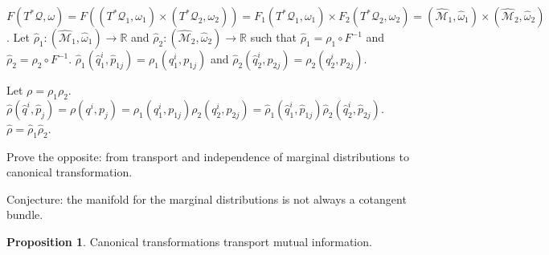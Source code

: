 \documentclass[smallextended]{svjour3}
\numberwithin{equation}{section}
\theoremstyle{definition}
\newtheorem{prop}[equation]{Proposition}
\begin{document}
$F(T^*\mathcal{Q}, \omega) = F((T^*\mathcal{Q}_1, \omega_1) \times (T^*\mathcal{Q}_2, \omega_2)) = F_1(T^*\mathcal{Q}_1, \omega_1) \times F_2(T^*\mathcal{Q}_2, \omega_2) = (\hat{\mathcal{M}}_1, \hat{\omega}_1) \times (\hat{\mathcal{M}}_2, \hat{\omega}_2)$.
Let $\hat{\rho}_1 : (\hat{\mathcal{M}}_1, \hat{\omega}_1) \rightarrow \mathbb{R}$ and $\hat{\rho}_2 : (\hat{\mathcal{M}}_2, \hat{\omega}_2) \rightarrow \mathbb{R}$ such that $\hat{\rho}_1 = \rho_1 \circ F^{-1 }$ and $\hat{\rho}_2 = \rho_2 \circ F^{-1 }$.  $\hat{\rho}_1(\hat{q}_1^i, \hat{p}_{1j})=\rho_1(q_1^i, p_{1j})$ and $\hat{\rho}_2(\hat{q}_2^i, \hat{p}_{2j})=\rho_2(q_2^i, p_{2j})$.

Let $\rho=\rho_1\rho_2$. $\hat{\rho}(\hat{q}^i, \hat{p}_j) =\rho(q^i, p_j)=\rho_1(q_1^i, p_{1j})\rho_2(q_2^i, p_{2j})=\hat{\rho}_1(\hat{q}_1^i, \hat{p}_{1j})\hat{\rho}_2(\hat{q}_2^i, \hat{p}_{2j})$. $\hat{\rho}=\hat{\rho}_1\hat{\rho}_2$.

Prove the opposite: from transport and independence of marginal distributions to canonical transformation.

Conjecture: the manifold for the marginal distributions is not always a cotangent bundle.


\begin{prop}
	Canonical transformations transport mutual information.
\end{prop}

\begin{thebibliography}{0}
	
\end{thebibliography}
\end{document}
